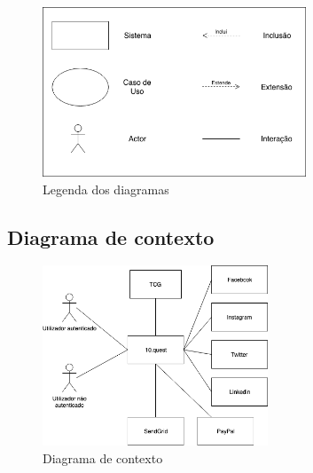 \begin{figure}[ht!]
	\begin{center}
		\includegraphics[width=0.7\textwidth]{img/rf/legenda}
		\caption{Legenda dos diagramas}
		\label{fig:rf-legenda}
	\end{center}
\end{figure}


\subsection{Diagrama de contexto}
\label{d:contexto}
\begin{figure}[ht!]
	\begin{center}
		\includegraphics[width=0.6\textwidth]{img/rf/10quest}
		\caption{Diagrama de contexto}
		\label{fig:rf-10quest}
	\end{center}
\end{figure}

\newpage

